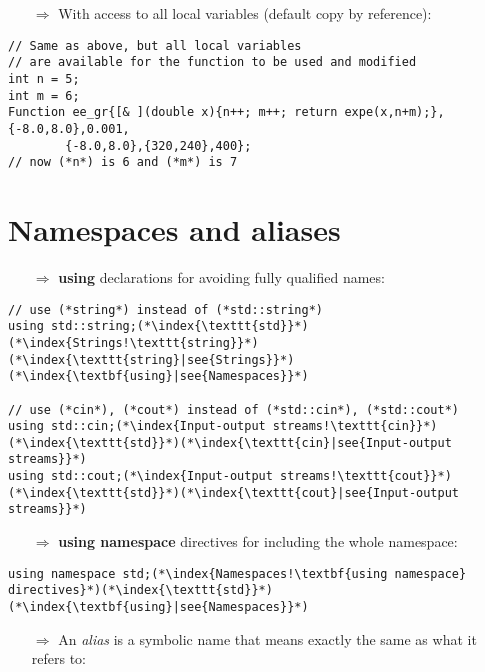 \documentclass[10pt]{article}
\begin{document}
\begin{enumerate}
\item[$\Rightarrow$] With access to all local variables (default copy by reference):
\end{enumerate}
\begin{lstlisting}
// Same as above, but all local variables
// are available for the function to be used and modified
int n = 5;
int m = 6;
Function ee_gr{[& ](double x){n++; m++; return expe(x,n+m);},{-8.0,8.0},0.001,
        {-8.0,8.0},{320,240},400};
// now (*n*) is 6 and (*m*) is 7
 \end{lstlisting}
%
%
\section{Namespaces and aliases}
\small
\begin{enumerate}
\item[$\Rightarrow$] \textbf{using} declarations for avoiding fully qualified names:
\end{enumerate}
\begin{lstlisting}
// use (*string*) instead of (*std::string*)
using std::string;(*\index{\texttt{std}}*)(*\index{Strings!\texttt{string}}*)(*\index{\texttt{string}|see{Strings}}*)(*\index{\textbf{using}|see{Namespaces}}*)

// use (*cin*), (*cout*) instead of (*std::cin*), (*std::cout*)
using std::cin;(*\index{Input-output streams!\texttt{cin}}*)(*\index{\texttt{std}}*)(*\index{\texttt{cin}|see{Input-output streams}}*)
using std::cout;(*\index{Input-output streams!\texttt{cout}}*)(*\index{\texttt{std}}*)(*\index{\texttt{cout}|see{Input-output streams}}*)
\end{lstlisting}
\begin{enumerate}
\item[$\Rightarrow$] \textbf{using namespace} directives for including the whole namespace:
\end{enumerate}
\begin{lstlisting}
using namespace std;(*\index{Namespaces!\textbf{using namespace} directives}*)(*\index{\texttt{std}}*)(*\index{\textbf{using}|see{Namespaces}}*)
\end{lstlisting}
\begin{enumerate}
\item[$\Rightarrow$] An \emph{alias} is a symbolic name that means exactly the same as what it refers to:
\end{enumerate}
\end{document}
